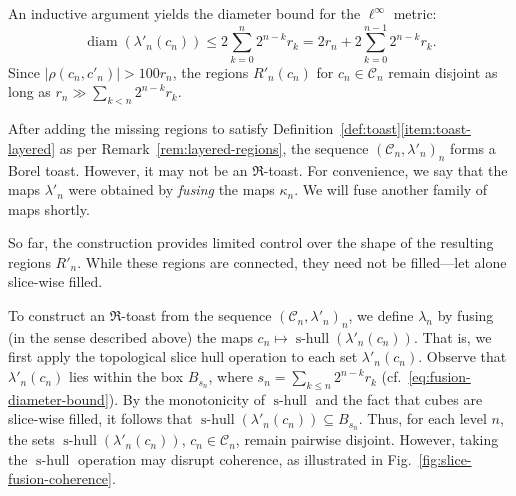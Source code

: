 \documentclass[12pt]{paper}
\numberwithin{equation}{section}
\theoremstyle{plain}
\theoremstyle{definition}
\newcommand{\mfR}{\mathfrak{R}}
\DeclareMathOperator*{\diam}{\mathrm{diam}}
\DeclareMathOperator{\shull}{\mathrm{s-hull}}
\begin{document}
An inductive argument yields the diameter bound for the \(\ell^{\infty}\) metric:
\begin{equation}
  \label{eq:fusion-diameter-bound}
  \diam(\lambda'_{n}(c_{n})) \le 2\sum_{k=0}^{n}2^{n-k}r_{k} = 2r_{n} + 2\sum_{k=0}^{n-1}2^{n-k}r_{k}.
\end{equation}
Since \(|\rho(c_{n},c'_{n})| > 100r_{n}\), the regions \(R'_{n}(c_{n})\) for
\(c_{n} \in \mathcal{C}_{n}\) remain disjoint as long as \(r_{n} \gg \sum_{k< n}2^{n-k}r_{k}\).

After adding the missing regions to satisfy Definition~\ref{def:toast}\eqref{item:toast-layered} as
per Remark~\ref{rem:layered-regions}, the sequence \((\mathcal{C}_{n}, \lambda'_{n})_{n}\) forms a
Borel toast. However, it may not be an \(\mfR\)-toast. For convenience, we say that the maps
\(\lambda'_{n}\) were obtained by \emph{fusing} the maps \(\kappa_{n}\). We will fuse another family
of maps shortly.

So far, the construction provides limited control over the shape of the resulting regions
\(R'_{n}\). While these regions are connected, they need not be filled---let alone slice-wise filled.

To construct an \(\mfR\)-toast from the sequence \((\mathcal{C}_{n}, \lambda'_{n})_{n}\), we define
\(\lambda_{n}\) by fusing (in the sense described above) the maps
\(c_{n} \mapsto \shull(\lambda'_{n}(c_{n}))\). That is, we first apply the topological slice hull
operation to each set \(\lambda'_{n}(c_{n})\). Observe that \(\lambda'_{n}(c_{n})\) lies within the
box \(B_{s_{n}}\), where \(s_{n} = \sum_{k\le n}2^{n-k}r_{k}\)
(cf.~\eqref{eq:fusion-diameter-bound}). By the monotonicity of \(\shull\) and the fact that cubes
are slice-wise filled, it follows that \(\shull(\lambda'_{n}(c_{n})) \subseteq B_{s_{n}}\). Thus,
for each level \(n\), the sets \(\shull(\lambda'_{n}(c_{n}))\), \(c_{n} \in \mathcal{C}_{n}\),
remain pairwise disjoint. However, taking the \(\shull\) operation may disrupt coherence, as
illustrated in Fig.~\ref{fig:slice-fusion-coherence}.
\end{document}
